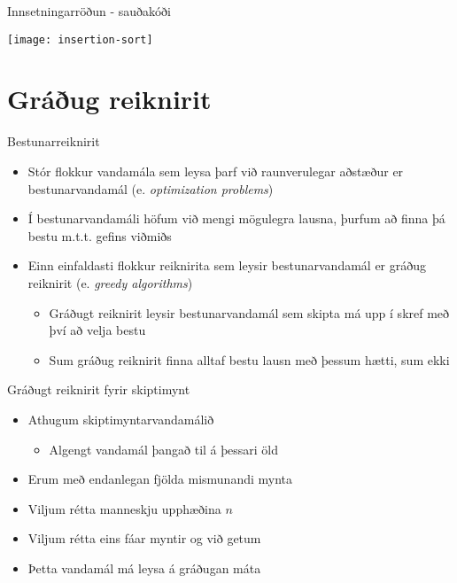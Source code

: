 \documentclass{beamer}
\begin{document}
\begin{frame}{Innsetningarröðun - sauðakóði}
\begin{center}
\texttt{[image: insertion-sort]}
\end{center}
\end{frame}

\section{Gráðug reiknirit}

\begin{frame}{Bestunarreiknirit}
\begin{itemize}
 \item Stór flokkur vandamála sem leysa þarf við raunverulegar aðstæður er bestunarvandamál (e. \emph{optimization problems})
 \item Í bestunarvandamáli höfum við mengi mögulegra lausna, þurfum að finna þá bestu m.t.t. gefins viðmiðs
 \item Einn einfaldasti flokkur reiknirita sem leysir bestunarvandamál er gráðug reiknirit (e. \emph{greedy algorithms})
 \begin{itemize}
  \item Gráðugt reiknirit leysir bestunarvandamál sem skipta má upp í skref með því að velja bestu
  \item Sum gráðug reiknirit finna alltaf bestu lausn með þessum hætti, sum ekki
 \end{itemize}
\end{itemize}
\end{frame}

\begin{frame}{Gráðugt reiknirit fyrir skiptimynt}
\begin{itemize}
 \item Athugum skiptimyntarvandamálið
 \begin{itemize}
  \item Algengt vandamál þangað til á þessari öld
 \end{itemize}
 \item Erum með endanlegan fjölda mismunandi mynta
 \item Viljum rétta manneskju upphæðina $n$
 \item Viljum rétta eins fáar myntir og við getum
 \item Þetta vandamál má leysa á gráðugan máta
\end{itemize}
\end{frame}
\end{document}

